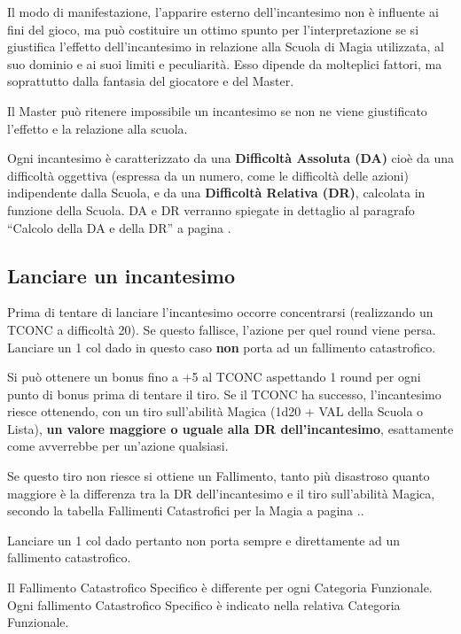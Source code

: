 Il modo di manifestazione, l'apparire esterno dell'incantesimo non
\`e influente ai fini del gioco, ma pu\`o costituire un ottimo
spunto per l'interpretazione se si giustifica l'effetto
dell'incantesimo in relazione alla Scuola di Magia utilizzata, al suo
dominio e ai suoi limiti e peculiarit\`a.  Esso dipende da
molteplici fattori, ma soprattutto dalla fantasia del giocatore e del
Master.

Il Master pu\`o ritenere impossibile un incantesimo se non ne viene
giustificato l'effetto e la relazione alla scuola. 

Ogni incantesimo \`e caratterizzato da una \textbf{Difficolt\`a
  Assoluta (DA)} cio\`e da una difficolt\`a oggettiva (espressa da
un numero, come le difficolt\`a delle azioni) indipendente dalla
Scuola, e da una \textbf{Difficolt\`a Relativa (DR)}, calcolata in
funzione della Scuola. DA e DR verranno spiegate in dettaglio al
paragrafo ``Calcolo della DA e della DR'' a pagina \pageref{dadr}.

\subsection{Lanciare un incantesimo}
\label{lanciareincantesimo}

Prima di tentare di lanciare l'incantesimo occorre concentrarsi
(realizzando un TCONC a difficolt\`a 20). Se questo fallisce,
l'azione per quel round viene persa. Lanciare un 1 col dado in questo
caso \textbf{non} porta ad un fallimento catastrofico.

\iffullversion
Si pu\`o ottenere un bonus fino a +5 al TCONC aspettando 1 round per
ogni punto di bonus prima di tentare il tiro. Se il TCONC ha successo,
l'incantesimo riesce ottenendo, con un tiro sull'abilit\`a Magica
(1d20 + VAL della Scuola o Lista), \textbf{un valore maggiore o uguale
  alla DR dell'incantesimo}, esattamente come avverrebbe per
un'azione qualsiasi.
\fi

Se questo tiro non riesce si ottiene un Fallimento, tanto pi\`u
disastroso quanto maggiore \`e la differenza tra la DR
dell'incantesimo e il tiro sull'abilit\`a Magica\iffullversion, secondo la tabella
Fallimenti Catastrofici per la Magia a pagina
\pageref{fumblemagia}.\else.\fi

Lanciare un 1 col dado pertanto non porta sempre e direttamente ad un
fallimento catastrofico.

Il Fallimento Catastrofico Specifico \`e differente per ogni
Categoria Funzionale.  Ogni fallimento Catastrofico Specifico \`e
indicato nella relativa Categoria Funzionale.

